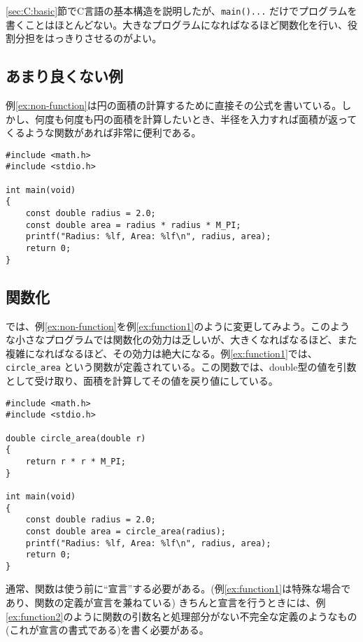 \ref{sec:C:basic}節でC言語の基本構造を説明したが、\texttt{main(){...}} だけでプログラムを書くことはほとんどない。大きなプログラムになればなるほど関数化を行い、役割分担をはっきりさせるのがよい。

\subsection{あまり良くない例}
例\ref{ex:non-function}は円の面積の計算するために直接その公式を書いている。しかし、何度も何度も円の面積を計算したいとき、半径を入力すれば面積が返ってくるような関数があれば非常に便利である。
\begin{reidai}\label{ex:non-function}
    \begin{verbatim}
#include <math.h>
#include <stdio.h>

int main(void)
{
    const double radius = 2.0;
    const double area = radius * radius * M_PI;
    printf("Radius: %lf, Area: %lf\n", radius, area);
    return 0;
}
\end{verbatim}
\end{reidai}

\subsection{関数化}
では、例\ref{ex:non-function}を例\ref{ex:function1}のように変更してみよう。このような小さなプログラムでは関数化の効力は乏しいが、大きくなればなるほど、また複雑になればなるほど、その効力は絶大になる。例\ref{ex:function1}では、\texttt{circle\_area} という関数が定義されている。この関数では、double型の値を引数として受け取り、面積を計算してその値を戻り値にしている。

\begin{reidai}\label{ex:function1}
    \begin{verbatim}
#include <math.h>
#include <stdio.h>

double circle_area(double r)
{
    return r * r * M_PI;
}

int main(void)
{
    const double radius = 2.0;
    const double area = circle_area(radius);
    printf("Radius: %lf, Area: %lf\n", radius, area);
    return 0;
}
\end{verbatim}
\end{reidai}

通常、関数は使う前に``宣言''する必要がある。(例\ref{ex:function1}は特殊な場合であり、関数の定義が宣言を兼ねている)
きちんと宣言を行うときには、例\ref{ex:function2}のように関数の引数名と処理部分がない不完全な定義のようなもの(これが宣言の書式である)を書く必要がある。

